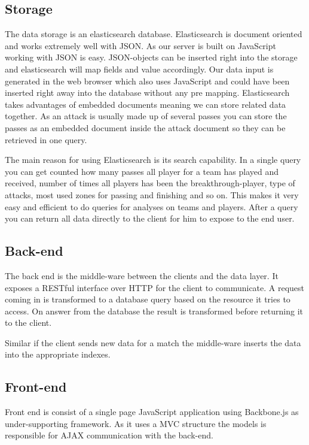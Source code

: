 \subsection{Storage}

The data storage is an elasticsearch database. Elasticsearch is document oriented and works extremely well with JSON. As our server is built on JavaScript working with JSON is easy. JSON-objects can be inserted right into the storage and elasticsearch will map fields and value accordingly.  Our data input is generated in the web browser which also uses JavaScript and could have been inserted right away into the database without any pre mapping.
Elasticsearch takes advantages of embedded documents meaning we can store related data together. As an attack is usually made up of several passes you can store the passes as an embedded document inside the attack document so they can be retrieved in one query. 

The main reason for using Elasticsearch is its search capability. In a single query you can get counted how many passes all player for a team has played and received, number of times all players has been the breakthrough-player, type of attacks, most used zones for passing and finishing and so on. This makes it very easy and efficient to do queries for analyses on teams and players. After a query you can return all data directly to the client for him to expose to the end user.

\subsection{Back-end}

The back end is the middle-ware between the clients and the data layer. It exposes a RESTful interface over HTTP for the client to communicate. A request coming in is transformed to a database query based on the resource it tries to access. On answer from the database the result is transformed before returning it to the client. 

Similar if the client sends new data for a match the middle-ware inserts the data into the appropriate indexes.


\subsection{Front-end}

Front end is consist of a single page JavaScript application using Backbone.js as under-supporting framework. As it uses a MVC structure the models is responsible for AJAX communication with the back-end. 

